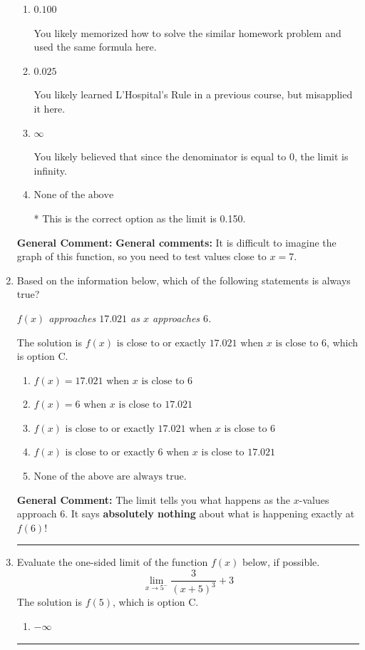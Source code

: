 \documentclass{extbook}[14pt]
\newcommand{\litem}[1]{\item #1

\rule{\textwidth}{0.4pt}}
\begin{document}
\begin{enumerate}
{\begin{enumerate}[label=\Alph*.]
You likely tried to use a shortcut to find the limit of a function that only works for when the numerator/denominator are polynomials.
\item \( 0.100 \)

You likely memorized how to solve the similar homework problem and used the same formula here.
\item \( 0.025 \)

You likely learned L'Hospital's Rule in a previous course, but misapplied it here.
\item \( \infty \)

You likely believed that since the denominator is equal to 0, the limit is infinity.
\item \( \text{None of the above} \)

* This is the correct option as the limit is 0.150.
\end{enumerate}

\textbf{General Comment:} \textbf{General comments:} It is difficult to imagine the graph of this function, so you need to test values close to $x = 7$.
}
\litem{
Based on the information below, which of the following statements is always true?

\begin{center}
    \textit{ $f(x)$ approaches $17.021$ as $x$ approaches $6$. }
\end{center}
The solution is \( f(x) \text{ is close to or exactly } 17.021 \text{ when } x \text{ is close to } 6 \), which is option C.\begin{enumerate}[label=\Alph*.]
\item \( f(x) = 17.021 \text{ when } x \text{ is close to } 6 \)


\item \( f(x) = 6 \text{ when } x \text{ is close to } 17.021 \)


\item \( f(x) \text{ is close to or exactly } 17.021 \text{ when } x \text{ is close to } 6 \)


\item \( f(x) \text{ is close to or exactly } 6 \text{ when } x \text{ is close to } 17.021 \)


\item \( \text{None of the above are always true.} \)


\end{enumerate}

\textbf{General Comment:} The limit tells you what happens as the $x$-values approach $6$. It says \textbf{absolutely nothing} about what is happening exactly at $f(6)$!
}
\litem{
Evaluate the one-sided limit of the function $f(x)$ below, if possible.
\[ \lim_{x \rightarrow 5^-} \frac{3}{(x+5)^3}+3 \]The solution is \( f(5) \), which is option C.\begin{enumerate}[label=\Alph*.]
\item \( -\infty \)



\end{enumerate}}
\end{enumerate}
\end{document}
